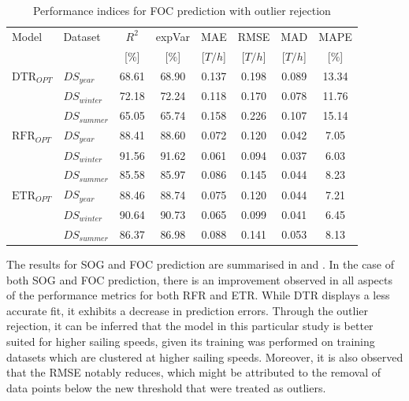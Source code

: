 \begin{table}[h!]
    \small
    \centering
    {\begin{tabular}{ l l c c c c c c }
    \hline
    Model & Dataset & $R^2$ & expVar & MAE & RMSE & MAD & MAPE \\
    & & [$\%$] & [$\%$] & [$T/h$] & [$T/h$] & [$T/h$] & [$\%$]  \\ 
    \hline
    $\text{DTR}_{OPT}$ & $DS_{year}$ & 68.61 & 68.90 & 0.137 & 0.198  & 0.089 & 13.34  \\
    & $DS_{winter}$ & 72.18 & 72.24 & 0.118 & 0.170 & 0.078 & 11.76 \\
    & $DS_{summer}$ & 65.05 & 65.74 & 0.158 &  0.226 & 0.107 & 15.14 \\
    $\text{RFR}_{OPT}$ & $DS_{year}$  & 88.41 & 88.60  & 0.072 & 0.120 & 0.042 & 7.05 \\
    & $DS_{winter}$ & 91.56 & 91.62 & 0.061 & 0.094  & 0.037  & 6.03 \\
    & $DS_{summer}$ & 85.58 & 85.97 & 0.086 & 0.145 & 0.044 & 8.23 \\
    $\text{ETR}_{OPT}$ & $DS_{year}$ & 88.46 & 88.74 & 0.075  & 0.120 & 0.044 & 7.21\\
    & $DS_{winter}$ & 90.64 & 90.73 & 0.065 & 0.099 & 0.041 & 6.45 \\
    & $DS_{summer}$ & 86.37 & 86.98 & 0.088 & 0.141 & 0.053 & 8.13 \\
    \hline
    \end{tabular}}
\caption{Performance indices for FOC prediction with outlier rejection}\label{tbl:FOC_scores_errors_rejection}
\end{table}

The results for SOG and FOC prediction are summarised in  and . In the case of both SOG and FOC prediction, there is an improvement observed in all aspects of the performance metrics for both RFR and ETR. While DTR displays a less accurate fit, it exhibits a decrease in prediction errors. Through the outlier rejection, it can be inferred that the model in this particular study is better suited for higher sailing speeds, given its training was performed on training datasets which are clustered at higher sailing speeds. Moreover, it is also observed that the RMSE notably reduces, which might be attributed to the removal of data points below the new threshold that were treated as outliers. \\

